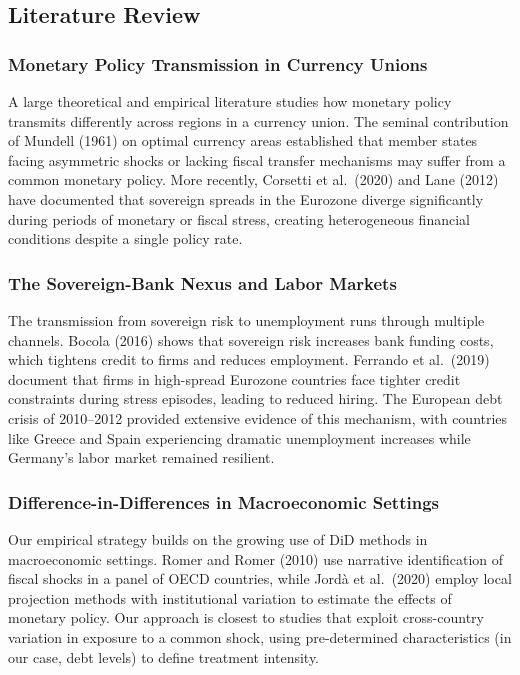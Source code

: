 \documentclass[12pt,a4paper]{article}
\begin{document}
\subsection{Literature Review}

\subsubsection{Monetary Policy Transmission in Currency Unions}

A large theoretical and empirical literature studies how monetary policy transmits differently across regions in a currency union. The seminal contribution of Mundell (1961) on optimal currency areas established that member states facing asymmetric shocks or lacking fiscal transfer mechanisms may suffer from a common monetary policy. More recently, Corsetti et al.\ (2020) and Lane (2012) have documented that sovereign spreads in the Eurozone diverge significantly during periods of monetary or fiscal stress, creating heterogeneous financial conditions despite a single policy rate.

\subsubsection{The Sovereign-Bank Nexus and Labor Markets}

The transmission from sovereign risk to unemployment runs through multiple channels. Bocola (2016) shows that sovereign risk increases bank funding costs, which tightens credit to firms and reduces employment. Ferrando et al.\ (2019) document that firms in high-spread Eurozone countries face tighter credit constraints during stress episodes, leading to reduced hiring. The European debt crisis of 2010--2012 provided extensive evidence of this mechanism, with countries like Greece and Spain experiencing dramatic unemployment increases while Germany's labor market remained resilient.

\subsubsection{Difference-in-Differences in Macroeconomic Settings}

Our empirical strategy builds on the growing use of DiD methods in macroeconomic settings. Romer and Romer (2010) use narrative identification of fiscal shocks in a panel of OECD countries, while Jord\`{a} et al.\ (2020) employ local projection methods with institutional variation to estimate the effects of monetary policy. Our approach is closest to studies that exploit cross-country variation in exposure to a common shock, using pre-determined characteristics (in our case, debt levels) to define treatment intensity.
\end{document}
